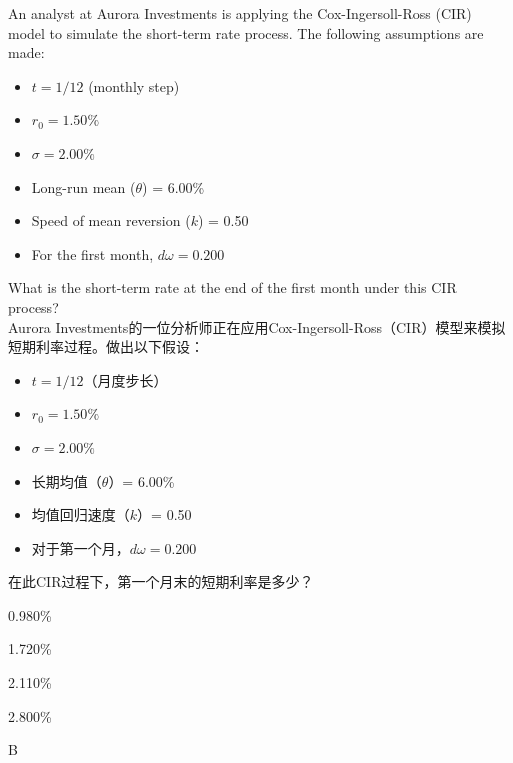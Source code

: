 \documentclass{article}
\newcounter{question} %
\begin{document}
\begin{question}
    An analyst at Aurora Investments is applying the Cox-Ingersoll-Ross (CIR) model to simulate the short-term rate process. The following assumptions are made:
\begin{itemize}
    \item \( t = 1/12 \) (monthly step)
    \item \( r_0 = 1.50\% \)
    \item \( \sigma = 2.00\% \)
    \item Long-run mean (\( \theta \)) = 6.00\%
    \item Speed of mean reversion (\( k \)) = 0.50
    \item For the first month, \( d\omega = 0.200 \)
\end{itemize}

    What is the short-term rate at the end of the first month under this CIR process?
    \\    Aurora Investments的一位分析师正在应用Cox-Ingersoll-Ross（CIR）模型来模拟短期利率过程。做出以下假设：
    \begin{itemize}
        \item \( t = 1/12 \)（月度步长）
        \item \( r_0 = 1.50\% \)
        \item \( \sigma = 2.00\% \)
        \item 长期均值（\( \theta \)）= 6.00\%
        \item 均值回归速度（\( k \)）= 0.50
        \item 对于第一个月，\( d\omega = 0.200 \)
    \end{itemize}
    
        在此CIR过程下，第一个月末的短期利率是多少？
\end{question}

\begin{choices}
    \item 0.980\%
    \item 1.720\%
    \item 2.110\%
    \item 2.800\%
\end{choices}

\begin{correctanswer}
    B
\end{correctanswer}
\end{document}
